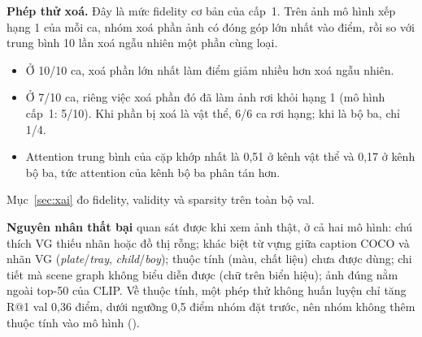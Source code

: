 \textbf{Phép thử xoá.} Đây là mức fidelity cơ bản của cấp~1. Trên ảnh mô hình xếp hạng 1 của mỗi ca, nhóm xoá phần ảnh có
đóng góp lớn nhất vào điểm, rồi so với trung bình 10 lần xoá ngẫu nhiên một phần cùng loại.
\begin{itemize}
\item Ở 10/10 ca, xoá phần lớn nhất làm điểm giảm nhiều hơn xoá ngẫu nhiên.
\item Ở 7/10 ca, riêng việc xoá phần đó đã làm ảnh rơi khỏi hạng 1 (mô hình cấp~1: 5/10). Khi phần bị xoá là vật thể, 6/6 ca
rơi hạng; khi là bộ ba, chỉ 1/4.
\item Attention trung bình của cặp khớp nhất là 0,51 ở kênh vật thể và 0,17 ở kênh bộ ba, tức attention của kênh bộ ba
phân tán hơn.
\end{itemize}
Mục~\ref{sec:xai} đo fidelity, validity và sparsity trên toàn bộ val.

\textbf{Nguyên nhân thất bại} quan sát được khi xem ảnh thật, ở cả hai mô hình: chú thích VG thiếu nhãn hoặc đồ thị rỗng;
khác biệt từ vựng giữa caption COCO và nhãn VG (\emph{plate}/\emph{tray}, \emph{child}/\emph{boy}); thuộc tính (màu, chất
liệu) chưa được dùng; chi tiết mà scene graph không biểu diễn được (chữ trên biển hiệu); ảnh đúng nằm ngoài top-50 của CLIP.
Về thuộc tính, một phép thử không huấn luyện chỉ tăng R@1 val 0,36 điểm, dưới ngưỡng 0,5 điểm nhóm đặt trước, nên nhóm
không thêm thuộc tính vào mô hình ().
